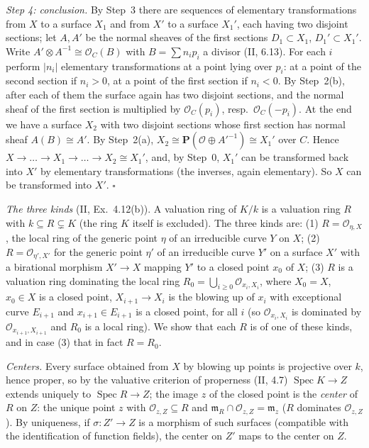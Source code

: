 \documentclass[11pt]{article}
\begin{document}
\emph{Step 4: conclusion.} By Step~3 there are sequences of elementary transformations from $X$ to a surface $X_1$ and from $X'$ to a surface $X_1'$, each having two disjoint sections; let $A,A'$ be the normal sheaves of the first sections $D_1\subset X_1$, $D_1'\subset X_1'$. Write $A'\otimes A^{-1}\cong\mathcal O_C(B)$ with $B=\sum n_ip_i$ a divisor (II, 6.13). For each $i$ perform $|n_i|$ elementary transformations at a point lying over $p_i$: at a point of the second section if $n_i>0$, at a point of the first section if $n_i<0$. By Step~2(b), after each of them the surface again has two disjoint sections, and the normal sheaf of the first section is multiplied by $\mathcal O_C(p_i)$, resp.\ $\mathcal O_C(-p_i)$. At the end we have a surface $X_2$ with two disjoint sections whose first section has normal sheaf $A(B)\cong A'$. By Step~2(a), $X_2\cong\mathbf P(\mathcal O\oplus A'^{-1})\cong X_1'$ over $C$. Hence $X\to\dots\to X_1\to\dots\to X_2\cong X_1'$, and, by Step~0, $X_1'$ can be transformed back into $X'$ by elementary transformations (the inverses, again elementary). So $X$ can be transformed into $X'$. \hfill$\square$

\pf
\emph{The three kinds} (II, Ex.~4.12(b)). A valuation ring of $K/k$ is a valuation ring $R$ with $k\subseteq R\subsetneq K$ (the ring $K$ itself is excluded). The three kinds are: (1) $R=\mathcal O_{\eta,X}$, the local ring of the generic point $\eta$ of an irreducible curve $Y$ on $X$; (2) $R=\mathcal O_{\eta',X'}$ for the generic point $\eta'$ of an irreducible curve $Y'$ on a surface $X'$ with a birational morphism $X'\to X$ mapping $Y'$ to a closed point $x_0$ of $X$; (3) $R$ is a valuation ring dominating the local ring $R_0=\bigcup_{i\ge0}\mathcal O_{x_i,X_i}$, where $X_0=X$, $x_0\in X$ is a closed point, $X_{i+1}\to X_i$ is the blowing up of $x_i$ with exceptional curve $E_{i+1}$ and $x_{i+1}\in E_{i+1}$ is a closed point, for all $i$ (so $\mathcal O_{x_i,X_i}$ is dominated by $\mathcal O_{x_{i+1},X_{i+1}}$ and $R_0$ is a local ring). We show that each $R$ is of one of these kinds, and in case (3) that in fact $R=R_0$.

\emph{Centers.} Every surface obtained from $X$ by blowing up points is projective over $k$, hence proper, so by the valuative criterion of properness (II, 4.7) $\operatorname{Spec}K\to Z$ extends uniquely to $\operatorname{Spec}R\to Z$; the image $z$ of the closed point is the \emph{center} of $R$ on $Z$: the unique point $z$ with $\mathcal O_{z,Z}\subseteq R$ and $\mathfrak m_R\cap\mathcal O_{z,Z}=\mathfrak m_z$ ($R$ dominates $\mathcal O_{z,Z}$). By uniqueness, if $\sigma:Z'\to Z$ is a morphism of such surfaces (compatible with the identification of function fields), the center on $Z'$ maps to the center on $Z$.
\end{document}
